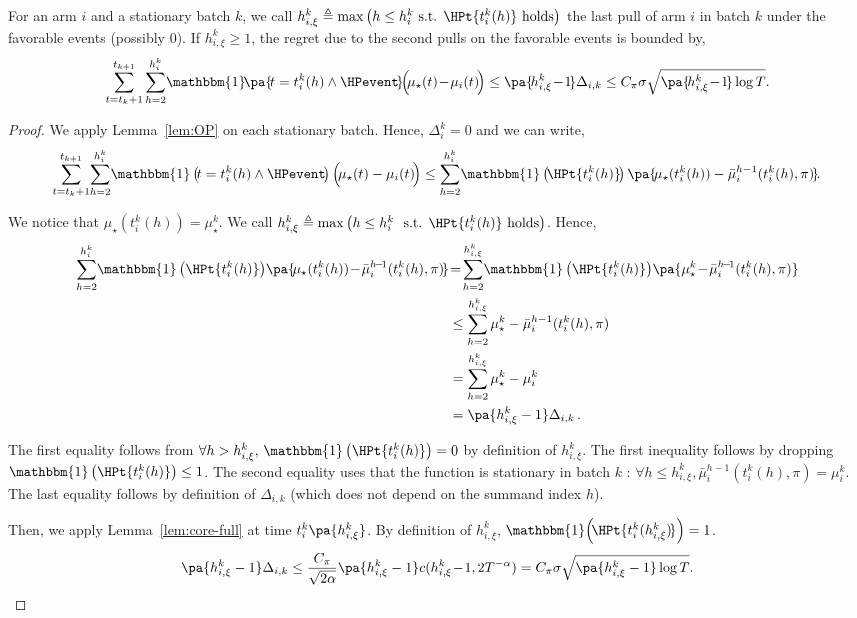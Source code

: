 \begin{lemma}
\label{lem:OP-piecewise}
For an arm $i$ and a stationary batch $k$, we call $h_{i,\xi}^k \triangleq \max\left(h \leq h_i^k \text{ s.t. } \HPt{t_i^k(h)} \text{ holds}\right)$ the last pull of arm $i$ in batch $k$ under the favorable events (possibly 0). If $h_{i,\xi}^k \geq 1$, the regret due to the second pulls on the favorable events is bounded by,
\[
\sum_{t=t_{k}+1}^{t_{k+1}} \sum_{h=2}^{h_{i}^{k}} \!\mathbbm{1}\!\pa{\! t=t_{i}^{k}(h) \land \HPevent \!}\!\Big(\!\mu_{\star}(t)\!-\!\mu_{i}(t)\!\Big) \leq\pa{\!h_{i, \xi}^{k}\!-\!1 \!} \Delta_{i, k} \leq C_\pi\sigma \sqrt{\pa{\!h_{i,\xi}^k\!-\!1\!}\log{T}}.
\]
\end{lemma}
\begin{proof}
We apply Lemma~\ref{lem:OP} on each stationary batch. Hence, $\Delta_i^k =0$ and we can write,
%
\begin{equation*}
\!\sum_{t=t_{k} +1 }^{t_{k+1}}\! \sum_{h=2}^{h^k_{i}} \! \mathbbm{1}\left(\!t = t_i^k(h) \land \HPevent \!\right)\Big(\! \mu_{\star}(t) - \mu_{i}(t)\!\Big) \leq   \sum_{h=2}^{h^k_{i}} \!\mathbbm{1}\left(\!\HPt{t_i^k(h)}\!\right)\pa{\!  \mu_{\star}(t_i^k(h)) - \bar{\mu}_i^{h-1}(t_i^k(h),\pi)\!}\! .
\end{equation*}

We notice that $\mu_{\star}(t_i^k(h)) = \mu_{\star}^{k}$. We call $h_{i,\xi}^k \triangleq \max\left(h \leq h_i^k\, \,\text{ s.t. } \HPt{t_i^k(h)} \text{ holds} \right)$. Hence,
\begin{align*}
\sum_{h=2}^{h^k_{i}}\!\mathbbm{1}\left(\HPt{t_i^k(h)}\right)\!\pa{ \! \mu_{\star}(t_i^k(h)) \!-\! \bar{\mu}_i^{h\!-\!1}(t_i^k(h),\pi)\!}  & \!=\! \sum_{h=2}^{h^k_{i,\xi}}\!\mathbbm{1}\left(\HPt{t_i^k(h)}\right)\!\pa{  \mu^k_{\star} \!-\! \bar{\mu}_i^{h\!-\!1}(t_i^k(h), \pi)} \\
 &\leq \sum_{h=2}^{h^k_{i, \xi}} \mu_{\star}^{k} - \bar{\mu}_i^{h-1}(t_i^k(h), \pi)\\
 &= \sum_{h=2}^{h^k_{i, \xi}} \mu_{\star}^{k} - \mu_i^k\\
 & = \pa{h_{i,\xi}^k - 1 }\Delta_{i,k}\, .  
\end{align*}

The first equality follows from $\forall h > h_{i,\xi}^k, \, \mathbbm{1}\left(\HPt{t_i^k(h)}\right) =0$ by definition of $h_{i,\xi}^k$. The first inequality follows by dropping $\mathbbm{1}\left(\HPt{t_i^k(h)}\right) \leq 1$. The second equality uses that the function is stationary in batch $k$ : $\forall h \leq h_{i,\xi}^k, \bar{\mu}_i^{h-1}(t_i^k(h), \pi) = \mu_{i}^k.$ The last equality follows by definition of $\Delta_{i,k}$ (which does not depend on the summand index $h$).

Then, we apply Lemma~\ref{lem:core-full} at time $t_i^k\pa{h_{i,\xi}^k}$. By definition of $h_{i,\xi}^k$, $\mathbbm{1}\!\left(\!\HPt{t_i^k(h_{i,\xi}^k)\!}\right) = 1$.
\begin{gather*}
 \pa{h_{i,\xi}^k - 1 }\Delta_{i,k}  \leq \frac{C_\pi}{\sqrt{2\alpha}}\pa{h_{i,\xi}^k - 1 }c(h_{i,\xi}^k\!-\!1, 2T^{-\alpha}) = C_\pi \sigma \sqrt{\pa{h_{i,\xi}^k-1}\log{T}}.\qedhere
\end{gather*} 
\end{proof}

